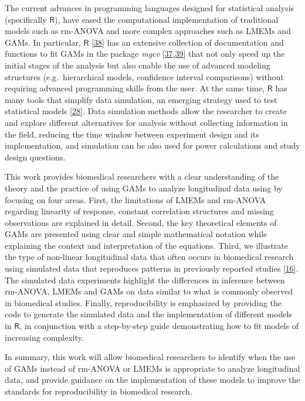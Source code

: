 \documentclass[
]{article}
\begin{document}
The current advances in programming languages designed for statistical analysis (specifically \(\textsf{R}\)), have eased the computational implementation of traditional models such as rm-ANOVA and more complex approaches such as LMEMs and GAMs. In particular, \(\textsf{R}\) {[}\protect\hyperlink{ref-r}{38}{]} has an extensive collection of documentation and functions to fit GAMs in the package \emph{mgcv} {[}\protect\hyperlink{ref-wood2017}{37},\protect\hyperlink{ref-wood2016}{39}{]} that not only speed up the initial stages of the analysis but also enable the use of advanced modeling structures (e.g.~hierarchical models, confidence interval comparisons) without requiring advanced programming skills from the user. At the same time, \(\textsf{R}\) has many tools that simplify data simulation, an emerging strategy used to test statistical models {[}\protect\hyperlink{ref-haverkamp2017}{28}{]}. Data simulation methods allow the researcher to create and explore different alternatives for analysis without collecting information in the field, reducing the time window between experiment design and its implementation, and simulation can be also used for power calculations and study design questions.

This work provides biomedical researchers with a clear understanding of the theory and the practice of using GAMs to analyze longitudinal data using by focusing on four areas. First, the limitations of LMEMs and rm-ANOVA regarding linearity of response, constant correlation structures and missing observations are explained in detail. Second, the key theoretical elements of GAMs are presented using clear and simple mathematical notation while explaining the context and interpretation of the equations. Third, we illustrate the type of non-linear longitudinal data that often occurs in biomedical research using simulated data that reproduces patterns in previously reported studies {[}\protect\hyperlink{ref-vishwanath2009}{16}{]}. The simulated data experiments highlight the differences in inference between rm-ANOVA, LMEMs and GAMs on data similar to what is commonly observed in biomedical studies. Finally, reproducibility is emphasized by providing the code to generate the simulated data and the implementation of different models in \(\textsf{R}\), in conjunction with a step-by-step guide demonstrating how to fit models of increasing complexity.

In summary, this work will allow biomedical researchers to identify when the use of GAMs instead of rm-ANOVA or LMEMs is appropriate to analyze longitudinal data, and provide guidance on the implementation of these models to improve the standards for reproducibility in biomedical research.
\end{document}
